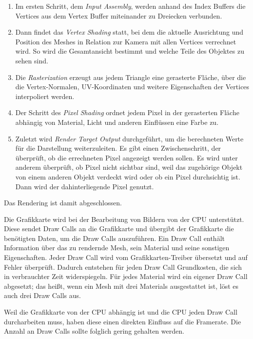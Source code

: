 \begin{enumerate}
\item Im ersten Schritt, dem \textit{Input Assembly}, werden anhand des Index Buffers die Vertices aus dem Vertex Buffer miteinander zu Dreiecken verbunden.
\item Dann findet das \textit{Vertex Shading} statt, bei dem die aktuelle Ausrichtung und Position des Meshes in Relation zur Kamera mit allen Vertices verrechnet wird. So wird die Gesamtansicht bestimmt und welche Teile des Objektes zu sehen sind.
\item Die \textit{Rasterization} erzeugt aus jedem Triangle eine gerasterte Fläche, über die die Vertex-Normalen, UV-Koordinaten und weitere Eigenschaften der Vertices interpoliert werden.
\item Der Schritt des \textit{Pixel Shading} ordnet jedem Pixel in der gerasterten Fläche abhängig von Material, Licht und anderen Einflüssen eine Farbe zu.
\item  Zuletzt wird \textit{Render Target Output} durchgeführt, um die berechneten Werte für die Darstellung weiterzuleiten. Es gibt einen Zwischenschritt, der überprüft, ob die errechneten Pixel angezeigt werden sollen. Es wird unter anderem überprüft, ob Pixel nicht sichtbar sind, weil das zugehörige Objekt von einem anderen Objekt verdeckt wird oder ob ein Pixel durchsichtig ist. Dann wird der dahinterliegende Pixel genutzt.
\vspace{-10.5pt}
\begin{flushright}\parencite{gpu}\end{flushright}
\end{enumerate}
Das Rendering ist damit abgeschlossen.
\par
Die Grafikkarte wird bei der Bearbeitung von Bildern von der CPU unterstützt. Diese sendet Draw Calls an die Grafikkarte und übergibt der Grafikkarte die benötigten Daten, um die Draw Calls auszuführen. Ein Draw Call enthält Information über das zu rendernde Mesh, sein Material und seine sonstigen Eigenschaften. Jeder Draw Call wird vom Grafikkarten-Treiber übersetzt und auf Fehler überprüft. Dadurch entstehen für jeden Draw Call Grundkosten, die sich in verbrauchter Zeit widerspiegeln. Für jedes Material wird ein eigener Draw Call abgesetzt; das heißt, wenn ein Mesh mit drei Materials ausgestattet ist, löst es auch drei Draw Calls aus.
\par
Weil die Grafikkarte von der CPU abhängig ist und die CPU jeden Draw Call durcharbeiten muss, haben diese einen direkten Einfluss auf die Framerate. Die Anzahl an Draw Calls sollte folglich gering gehalten werden. \parencite{gpu}
